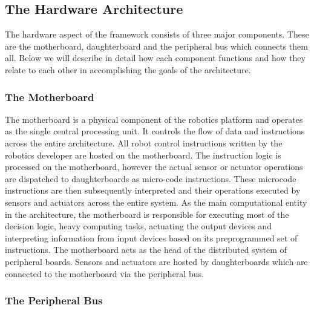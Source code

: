 \subsection{The Hardware Architecture} %
\label{sub:the_hardware_architecture}
The hardware aspect of the \xten framework consists of three major components. These are the motherboard, daughterboard and the peripheral bus which connects them all. Below we will describe in detail how each component functions and how they relate to each other in accomplishing the goals of the architecture.



	\subsubsection{The Motherboard} %
	\label{ssub:the_motherboard}
	The motherboard is a physical component of the robotics platform and operates as the single central processing unit. It controls the flow of data and instructions across the entire \xten architecture. All robot control instructions written by the robotics developer are hosted on the motherboard. The instruction logic is processed on the motherboard, however the actual sensor or actuator operations are dispatched to daughterboards as micro-code instructions. These microcode instructions are then subsequently interpreted and their operations executed by sensors and actuators across the entire system. As the main computational entity in the \xten architecture, the motherboard is responsible for executing most of the decision logic, heavy computing tasks, actuating the output devices and interpreting information from input devices based on its preprogrammed set of instructions.
The motherboard acts as the head of the distributed system of peripheral boards. Sensors and actuators are hosted by daughterboards which are connected to the motherboard via the peripheral bus. 
 
	
	\subsubsection{The Peripheral Bus} %
	\label{ssub:the_peripheral_bus}
	
